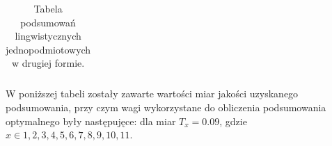 \documentclass{classrep}
\begin{document}
\begin{center}
\begin{table}[H]
\begin{tabularx}{\textwidth}{lXc}
    
  \end{tabularx}
  \caption{Tabela podsumowań lingwistycznych jednopodmiotowych w drugiej formie.}
\end{table}
\end{center}

W poniższej tabeli zostały zawarte wartości miar jakości uzyskanego podsumowania, przy czym wagi wykorzystane do
obliczenia podsumowania optymalnego były następujęce: dla miar $T_{x} = 0.09$, gdzie $x \in {1,2,3,4,5,6,7,8,9,10,11}$.
\end{document}
